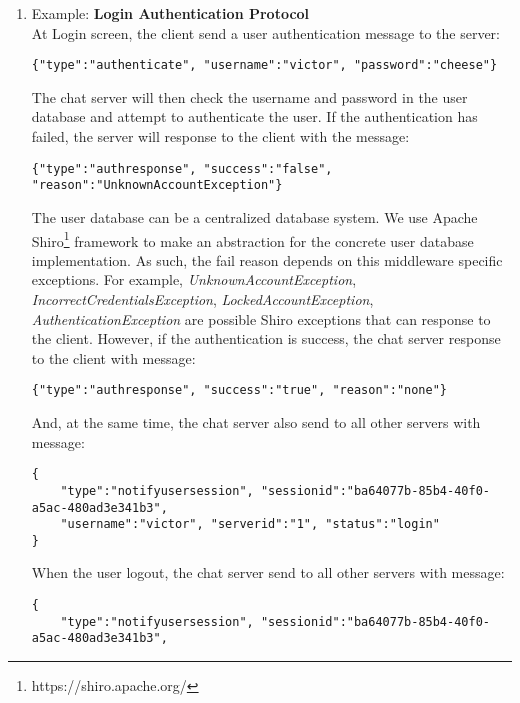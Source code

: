 \documentclass[dareport.tex]{subfiles}
\begin{document}
\begin{enumerate}[leftmargin=*]
\item Example: \textbf{Login Authentication Protocol}
\\
At Login screen, the client send a user authentication message to the server:
\begin{small}
\begin{verbatim}
{"type":"authenticate", "username":"victor", "password":"cheese"}
\end{verbatim}
\end{small}
The chat server will then check the username and password in the user database and attempt to authenticate the user. If the authentication has failed, the server will response to the client with the message:
\begin{small}
\begin{verbatim}
{"type":"authresponse", "success":"false", "reason":"UnknownAccountException"}
\end{verbatim}
\end{small}
The user database can be a centralized database system.
We use Apache Shiro\footnote{https://shiro.apache.org/} framework to make an abstraction for the concrete user database implementation. As such, the fail reason depends on this middleware specific exceptions. For example, \textit{UnknownAccountException}, \textit{IncorrectCredentialsException}, \textit{LockedAccountException}, \textit{AuthenticationException} are possible Shiro exceptions that can response to the client.
However, if the authentication is success, the chat server response to the client with message:
\begin{small}
\begin{verbatim}
{"type":"authresponse", "success":"true", "reason":"none"}
\end{verbatim}
\end{small}
And, at the same time, the chat server also send to all other servers with message:
\begin{small}
\begin{verbatim}
{
    "type":"notifyusersession", "sessionid":"ba64077b-85b4-40f0-a5ac-480ad3e341b3", 
    "username":"victor", "serverid":"1", "status":"login"
}
\end{verbatim}
\end{small}
When the user logout, the chat server send to all other servers with message:
\begin{small}
\begin{verbatim}
{
    "type":"notifyusersession", "sessionid":"ba64077b-85b4-40f0-a5ac-480ad3e341b3",

\end{verbatim}
\end{small}
\end{enumerate}
\end{document}
